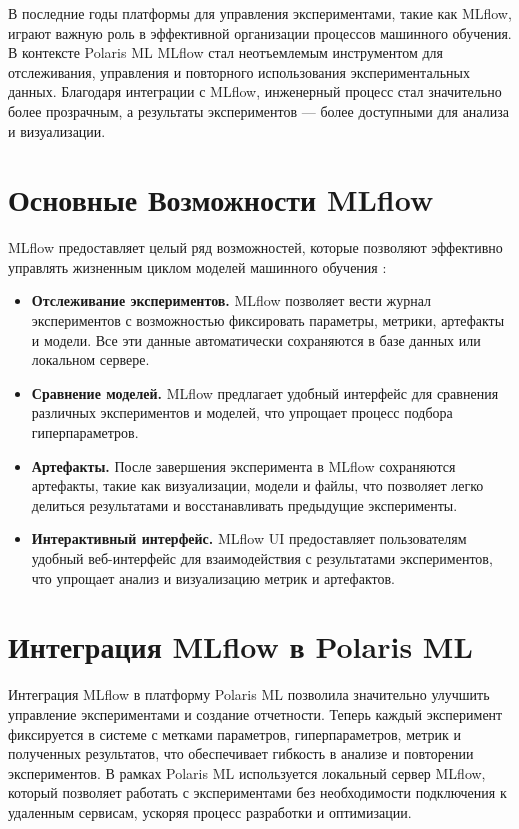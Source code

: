 \documentclass[14pt, a4paper]{src/bsu}
\begin{document}
В последние годы платформы для управления экспериментами, такие как MLflow,
играют важную роль в эффективной организации процессов машинного обучения. В
контексте Polaris ML MLflow стал неотъемлемым инструментом для отслеживания,
управления и повторного использования экспериментальных данных. Благодаря
интеграции с MLflow, инженерный процесс стал значительно более прозрачным, а
результаты экспериментов — более доступными для анализа и визуализации.

\section{Основные Возможности MLflow}

MLflow предоставляет целый ряд возможностей, которые позволяют эффективно
управлять жизненным циклом моделей машинного обучения \cite{mlflow_docs}:

\begin{itemize} \item \textbf{Отслеживание экспериментов.} MLflow позволяет
	      вести журнал экспериментов с возможностью фиксировать параметры, метрики,
	      артефакты и модели. Все эти данные автоматически сохраняются в базе
	      данных или локальном сервере. \item \textbf{Сравнение моделей.} MLflow
	      предлагает удобный интерфейс для сравнения различных экспериментов и
	      моделей, что упрощает процесс подбора гиперпараметров. \item
	      \textbf{Артефакты.} После завершения эксперимента в MLflow
	      сохраняются артефакты, такие как визуализации, модели и файлы, что
	      позволяет легко делиться результатами и восстанавливать предыдущие
	      эксперименты. \item \textbf{Интерактивный интерфейс.} MLflow UI
	      предоставляет пользователям удобный веб-интерфейс для
	      взаимодействия с результатами экспериментов, что упрощает анализ и
	      визуализацию метрик и артефактов. \end{itemize}

\section{Интеграция MLflow в Polaris ML}

Интеграция MLflow в платформу Polaris ML позволила значительно
улучшить управление экспериментами и создание отчетности. Теперь
каждый эксперимент фиксируется в системе с метками параметров,
гиперпараметров, метрик и полученных результатов, что обеспечивает
гибкость в анализе и повторении экспериментов. В рамках Polaris ML
используется локальный сервер MLflow, который позволяет работать с
экспериментами без необходимости подключения к удаленным сервисам,
ускоряя процесс разработки и оптимизации.
\end{document}
